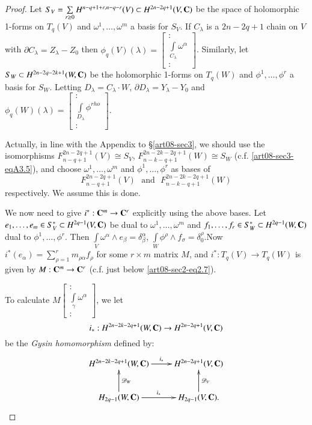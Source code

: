 \begin{proof}
Let $S_{V}=\sum\limits_{r\geq 0}H^{n-q+1+r,n-q-r}(V)\subset H^{2n-2q+1}(V,\mathbf{C})$ be the space of holomorphic 1-forms on $T_{q}(V)$ and $\omega^{1},\ldots,\omega^{m}$ a basis for $S_{V}$. If $C_{\lambda}$ is a $2n-2q+1$ chain on $V$ with $\partial C_{\lambda}=Z_{\lambda}-Z_{0}$ then $\phi_{q}(V)(\lambda)=\left[\begin{smallmatrix} :\\ \int\limits_{C_{\lambda}}\omega^{\alpha}\\ :\end{smallmatrix}\right]$. Similarly, let $S_{W}\subset H^{2n-2q-2k+1}(W,\mathbf{C})$ be the holomorphic 1-forms on $T_{q}(W)$ and $\phi^{1},\ldots,\phi^{r}$ a basis for $S_{W}$. Letting $D_{\lambda}=C_{\lambda}\cdot W$, $\partial D_{\lambda}=Y_{\lambda}-Y_{0}$ and $\phi_{q}(W)(\lambda)=\left[\begin{smallmatrix} :\\ \int\limits_{D_{\lambda}}\phi^{rho}\\ :\end{smallmatrix}\right]$.

Actually, in line with the Appendix to \S\ref{art08-sec3}, we should use the isomorphisms $F^{2n-2q+1}_{n-q+1}(V)\cong S_{V}$, $F^{2n-2k-2q+1}_{n-k-q+1}(W)\cong S_{W}$ (c.f. \eqref{art08-sec3-eqA3.5}), and choose $\omega^{1},\ldots,\omega^{m}$ and $\phi^{1},\ldots,\phi^{r}$ as bases of 
$$
F^{2n-2q+1}_{n-q+1}(V)\text{~ and~ } F^{2n-2k-2q+1}_{n-k-q+1}(W)
$$ 
respectively. We assume this is done.

We now need to give $i^{*}:\mathbf{C}^{m}\to \mathbf{C}^{r}$ explicitly using the above bases. Let $e_{1},\ldots,e_{m}\in S^{*}_{V}\subset H^{2q-1}(V,\mathbf{C})$ be dual to $\omega^{1},\ldots,\omega^{m}$ and $f_{1},\ldots,f_{r}\in S^{*}_{W}\subset H^{2q-1}(W,\mathbf{C})$ dual to $\phi^{1},\ldots,\phi^{r}$. Then $\int\limits_{V}\omega^{\alpha}\wedge e_{\beta}=\delta^{\alpha}_{\beta}$, $\int\limits_{W}\phi^{\rho}\wedge f_{\sigma}=\delta^{\rho}_{0}$.\pageoriginale Now $i^{*}(e_{\alpha})=\sum\limits^{r}_{\rho=1}m_{\rho\alpha}f_{\rho}$ for some $r\times m$ matrix $M$, and $i^{*}:T_{q}(V)\to T_{q}(W)$ is given by $M:\mathbf{C}^{m}\to \mathbf{C}^{r}$ (c.f. just below \eqref{art08-sec2-eq2.7}).

To calculate $M\left[\begin{smallmatrix} : \\ \int\limits_{\gamma}\omega^{\alpha}\\ :\end{smallmatrix}\right]$, we let 
$$
i_{*}:H^{2n-2k-2q+1}(W,\mathbf{C})\to H^{2n-2q+1}(V,\mathbf{C})
$$ 
be the {\em Gysin homomorphism} defined by:
\begin{equation}
\vcenter{\xymatrix{
H^{2n-2k-2q+1}(W,\bfC)\ar[r]^-{i_{*}} & H^{2n-2q+1}(V,\bfC)\\
H_{2q-1}(W,\bfC)\ar[u]_{\mathscr{D}_{W}}\ar[r]^-{i_{*}} & H_{2q-1}(V,\bfC).\ar[u]_{\mathscr{D}_{V}}
}}\label{art08-sec4-eq4.3}
\end{equation}


\end{proof}
